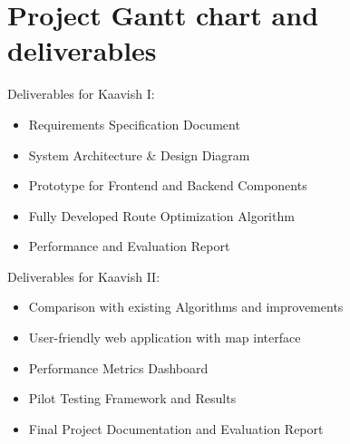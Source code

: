 \section{Project Gantt chart and deliverables}

Deliverables for Kaavish I:
\begin{itemize}
    \item Requirements Specification Document
    \item System Architecture \& Design Diagram
    \item Prototype for Frontend and Backend Components
    \item Fully Developed Route Optimization Algorithm
    \item Performance and Evaluation Report
\end{itemize}
Deliverables for Kaavish II:
\begin{itemize}
    \item Comparison with existing Algorithms and improvements
    \item User-friendly web application with map interface
    \item Performance Metrics Dashboard
    \item Pilot Testing Framework and Results
    \item Final Project Documentation and Evaluation Report
\end{itemize}



